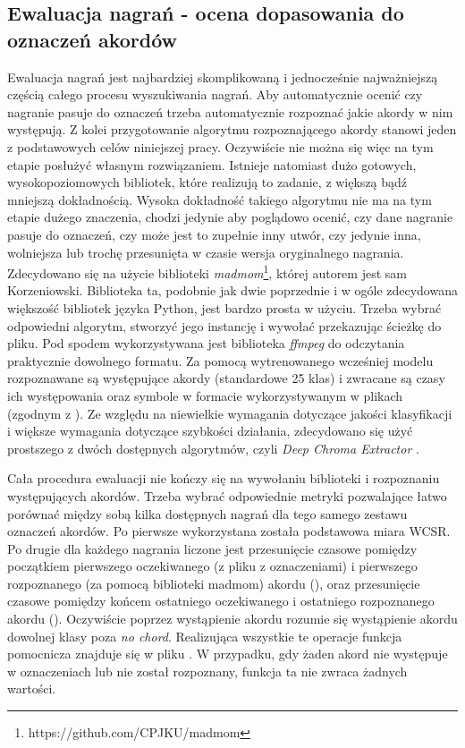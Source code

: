 \subsection{Ewaluacja nagrań - ocena dopasowania do oznaczeń akordów}
Ewaluacja nagrań jest najbardziej skomplikowaną i jednocześnie najważniejszą częścią całego procesu
wyszukiwania nagrań. Aby automatycznie ocenić czy nagranie pasuje do oznaczeń trzeba automatycznie
rozpoznać jakie akordy w nim występują. Z kolei przygotowanie algorytmu rozpoznającego akordy
stanowi jeden z podstawowych celów niniejszej pracy. Oczywiście nie można się więc na tym etapie
posłużyć własnym rozwiązaniem. Istnieje natomiast dużo gotowych, wysokopoziomowych bibliotek, które
realizują to zadanie, z większą bądź mniejszą dokładnością. Wysoka dokładność takiego algorytmu nie
ma na tym etapie dużego znaczenia, chodzi jedynie aby poglądowo ocenić, czy dane nagranie pasuje do
oznaczeń, czy może jest to zupełnie inny utwór, czy jedynie inna, wolniejsza lub trochę przesunięta
w czasie wersja oryginalnego nagrania. Zdecydowano się na użycie biblioteki
\emph{madmom}\footnote{https://github.com/CPJKU/madmom}, której autorem jest sam Korzeniowski.
Biblioteka ta, podobnie jak dwie poprzednie i w ogóle zdecydowana większość bibliotek języka Python,
jest bardzo prosta w użyciu. Trzeba wybrać odpowiedni algorytm, stworzyć jego instancję i wywołać
przekazując ścieżkę do pliku. Pod spodem wykorzystywana jest biblioteka \emph{ffmpeg} do odczytania
praktycznie dowolnego formatu. Za pomocą wytrenowanego wcześniej modelu rozpoznawane są występujące
akordy (standardowe 25 klas) i zwracane są czasy ich występowania oraz symbole w formacie
wykorzystywanym w plikach  (zgodnym z \cite{harte_towards_nodate}). Ze względu na
niewielkie wymagania dotyczące jakości klasyfikacji i większe wymagania dotyczące szybkości
działania, zdecydowano się użyć prostszego z dwóch dostępnych algorytmów, czyli \emph{Deep Chroma
Extractor} \cite{korzeniowski_feature_2016}.

Cała procedura ewaluacji nie kończy się na wywołaniu biblioteki i rozpoznaniu występujących akordów.
Trzeba wybrać odpowiednie metryki pozwalające łatwo porównać między sobą kilka dostępnych nagrań dla
tego samego zestawu oznaczeń akordów. Po pierwsze wykorzystana została podstawowa miara WCSR. Po drugie
dla każdego nagrania liczone jest przesunięcie czasowe pomiędzy początkiem pierwszego oczekiwanego
(z pliku z oznaczeniami) i pierwszego rozpoznanego (za pomocą biblioteki madmom) akordu
(), oraz przesunięcie czasowe pomiędzy końcem ostatniego oczekiwanego i ostatniego
rozpoznanego akordu (). Oczywiście poprzez wystąpienie akordu rozumie się
wystąpienie akordu dowolnej klasy poza \emph{no chord}. Realizująca wszystkie te operacje funkcja
pomocnicza znajduje się w pliku . W przypadku, gdy żaden akord
nie występuje w oznaczeniach lub nie został rozpoznany, funkcja ta nie zwraca żadnych wartości.

